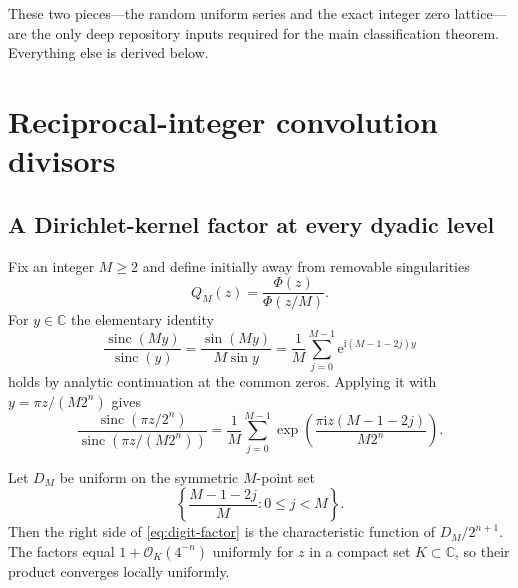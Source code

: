 \documentclass[11pt,oneside]{article}
\theoremstyle{definition}
\theoremstyle{remark}
\newcommand{\C}{\mathbb C}
\newcommand{\sinc}{\operatorname{sinc}}
\newcommand{\e}{\mathrm e}
\newcommand{\ii}{\mathrm i}
\newcommand{\bigO}{\mathcal O}
\numberwithin{equation}{section}
\newcommand{\1}{\mathbf 1}
\begin{document}
These two pieces---the random uniform series and the exact integer zero lattice---are the
only deep repository inputs required for the main classification theorem.  Everything else
is derived below.

\section{Reciprocal-integer convolution divisors}
\label{sec:divisors}

\subsection{A Dirichlet-kernel factor at every dyadic level}

Fix an integer $M\ge2$ and define initially away from removable singularities
\begin{equation}
 Q_M(z)=\frac{\Phi(z)}{\Phi(z/M)}.
 \label{eq:QM-quotient}
\end{equation}
For $y\in\C$ the elementary identity
\begin{equation}
 \frac{\sinc(My)}{\sinc(y)}
 =\frac{\sin(My)}{M\sin y}
 =\frac1M\sum_{j=0}^{M-1}\e^{\ii(M-1-2j)y}
 \label{eq:Dirichlet-kernel}
\end{equation}
holds by analytic continuation at the common zeros.  Applying it with
$y=\pi z/(M2^n)$ gives
\begin{equation}
 \frac{\sinc(\pi z/2^n)}{\sinc(\pi z/(M2^n))}
 =\frac1M\sum_{j=0}^{M-1}
 \exp\!\left(\frac{\pi\ii z(M-1-2j)}{M2^n}\right).
 \label{eq:digit-factor}
\end{equation}

Let $D_M$ be uniform on the symmetric $M$-point set
\begin{equation}
 \left\{\frac{M-1-2j}{M}:0\le j<M\right\}.
 \label{eq:DM}
\end{equation}
Then the right side of \eqref{eq:digit-factor} is the characteristic function of
$D_M/2^{n+1}$.  The factors equal $1+\bigO_K(4^{-n})$ uniformly for $z$ in a
compact set $K\subset\C$, so their product converges locally uniformly.
\end{document}
